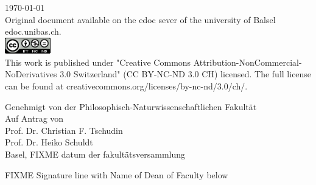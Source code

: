 \begin{titlepage}
\begin{center}

{\large \today\\[1cm]}
{\footnotesize Original document available on the edoc sever of the university of Balsel edoc.unibas.ch.\\[0.5cm]
\includegraphics[height=7mm]{./inc/cclic}~\\[0.5cm]
This work is published under  "Creative Commons Attribution-NonCommercial-NoDerivatives 3.0 Switzerland" (CC BY-NC-ND 3.0 CH) licensed. The full license can be found at creativecommons.org/licenses/by-nc-nd/3.0/ch/.
}

\end{center}
\end{titlepage}

\begin{titlepage}
\pagecolor{orange}\afterpage{\nopagecolor}
\begin{center}
Genehmigt von der Philosophisch-Naturwissenschaftlichen Fakultät\\
Auf Antrag von\\
Prof. Dr. Christian F. Tschudin\\Prof. Dr. Heiko Schuldt\\
\vfill 
Basel, FIXME datum der fakultätsversammlung
{\raggedright FIXME Signature line with Name of Dean of Faculty below}

\end{center}
\end{titlepage}

